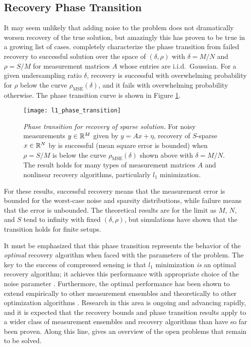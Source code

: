 \subsection{Recovery Phase Transition}
It may seem unlikely that adding noise to the problem does not dramatically worsen recovery of the true solution, but amazingly this has proven to be true in a growing list of cases. \textcite{DMM11} completely characterize the phase transition from failed recovery to successful solution over the space of $(\delta, \rho)$ with $\delta = M/N$ and $\rho = S/M$ for measurement matrices $A$ whose entries are i.i.d.\ Gaussian. For a given undersampling ratio $\delta$, recovery is successful with overwhelming probability for $\rho$ below the curve $\rho_\text{MSE}(\delta)$, and it fails with overwhelming probability otherwise. The phase transition curve is shown in Figure \ref{fig:l1_phase_transition}.
\begin{figure}[tpb]
 \centering
 \texttt{[image: l1\_phase\_transition]}
 \caption[Phase transition for recovery of sparse solution]{\emph{Phase transition for recovery of sparse solution.} For noisy measurements $y \in \mathbb{R}^M$ given by $y=Ax + \eta$, recovery of $S$-sparse $x \in \mathbb{R}^N$ by is successful (mean square error is bounded) when $\rho = S/M$ is below the curve $\rho_\text{MSE}(\delta)$ shown above with $\delta = M/N$. The result holds for many types of measurement matrices $A$ and nonlinear recovery algorithms, particularly $l_1$ minimization.}
 \label{fig:l1_phase_transition}
\end{figure}%
For these results, successful recovery means that the measurement error is bounded for the worst-case noise and sparsity distributions, while failure means that the error is unbounded. The theoretical results are for the limit as $M$, $N$, and $S$ tend to infinity with fixed $(\delta, \rho)$, but simulations have shown that the transition holds for finite setups.

It must be emphasized that this phase transition represents the behavior of the \emph{optimal} recovery algorithm when faced with the parameters of the problem. The key to the success of compressed sensing is that $l_1$ minimization \emph{is} an optimal recovery algorithm; it achieves this performance with appropriate choice of the noise parameter \autocite{DT09, DMM11}. Furthermore, the optimal performance has been shown to extend empirically to other measurement ensembles \autocite{DT10, MJG+13} and theoretically to other optimization algorithms \autocite{DJM13}. Research in this area is ongoing and advancing rapidly, and it is expected that the recovery bounds and phase transition results apply to a wider class of measurement ensembles and recovery algorithms than have so far been proven. Along this line, \textcite{Str12} gives an overview of the open problems that remain to be solved.

